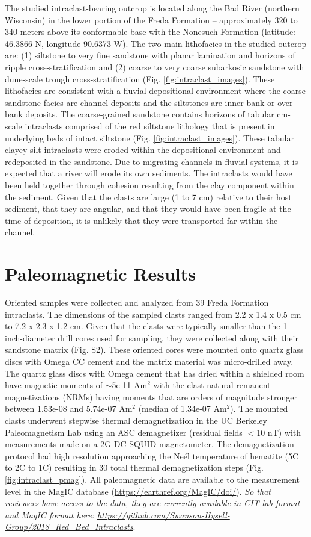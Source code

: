 \documentclass[draft]{agujournal2018}
\begin{document}
The studied intraclast-bearing outcrop is located along the Bad River (northern Wisconsin) in the lower portion of the Freda Formation -- approximately 320 to 340 meters above its conformable base with the Nonesuch Formation (latitude:  46.3866 \textdegree N, longitude 90.6373 \textdegree W). The two main lithofacies in the studied outcrop are: (1) siltstone to very fine sandstone with planar lamination and horizons of ripple cross-stratification and (2) coarse to very coarse subarkosic sandstone with dune-scale trough cross-stratification (Fig. \ref{fig:intraclast_images}). These lithofacies are consistent with a fluvial depositional environment where the coarse sandstone facies are channel deposits and the siltstones are inner-bank or over-bank deposits. The coarse-grained sandstone contains horizons of tabular cm-scale intraclasts comprised of the red siltstone lithology that is present in underlying beds of intact siltstone (Fig. \ref{fig:intraclast_images}). These tabular clayey-silt intraclasts were eroded within the depositional environment and redeposited in the sandstone. Due to migrating channels in fluvial systems, it is expected that a river will erode its own sediments. The intraclasts would have been held together through cohesion resulting from the clay component within the sediment. Given that the clasts are large (1 to 7 cm) relative to their host sediment, that they are angular, and that they would have been fragile at the time of deposition, it is unlikely that they were transported far within the channel.

\section*{Paleomagnetic Results}

Oriented samples were collected and analyzed from 39 Freda Formation intraclasts. The dimensions of the sampled clasts ranged from 2.2 x 1.4 x 0.5 cm to 7.2 x 2.3 x 1.2 cm. Given that the clasts were typically smaller than the 1-inch-diameter drill cores used for sampling, they were collected along with their sandstone matrix (Fig. S2). These oriented cores were mounted onto quartz glass discs with Omega CC cement and the matrix material was micro-drilled away. The quartz glass discs with Omega cement that has dried within a shielded room have magnetic moments of $\sim$5e-11 Am$^2$ with the clast natural remanent magnetizations (NRMs) having moments that are orders of magnitude stronger between 1.53e-08 and 5.74e-07 Am$^2$ (median of 1.34e-07 Am$^2$). The mounted clasts underwent stepwise thermal demagnetization in the UC Berkeley Paleomagnetism Lab using an ASC demagnetizer (residual fields $<$10 nT) with measurements made on a 2G DC-SQUID magnetometer. The demagnetization protocol had high resolution  approaching the Ne\'el temperature of hematite (5\textdegree C to 2\textdegree C to 1\textdegree C) resulting in 30 total thermal demagnetization steps (Fig. \ref{fig:intraclast_pmag}). All paleomagnetic data are available to the measurement level in the MagIC database (\url{https://earthref.org/MagIC/doi/}). \textit{So that reviewers have access to the data, they are currently available in CIT lab format and MagIC format here: \url{https://github.com/Swanson-Hysell-Group/2018_Red_Bed_Intraclasts}}.
\end{document}
